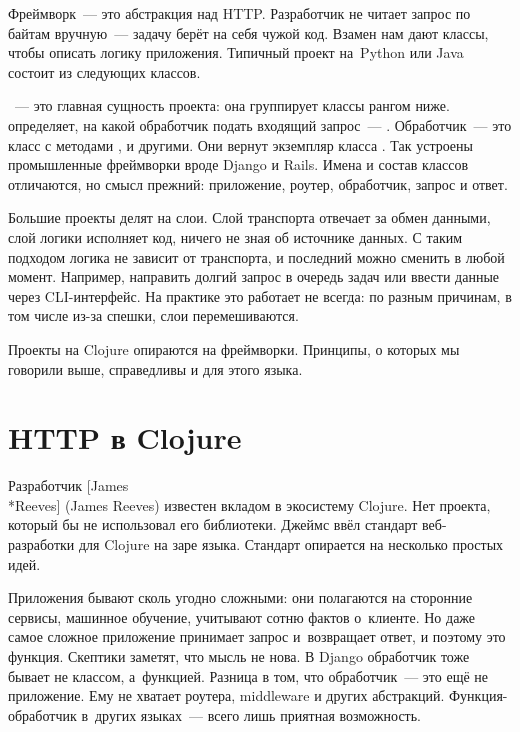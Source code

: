 Фреймворк~--- это абстракция над HTTP. Разработчик не читает запрос по байтам
вручную~--- задачу берёт на себя чужой код. Взамен нам дают классы, чтобы
описать логику приложения. Типичный проект на~Python или Java состоит из
следующих классов.

~--- это главная сущность проекта: она группирует классы рангом
ниже.  определяет, на какой обработчик подать входящий запрос~---
. Обработчик~--- это класс  с методами
,  и другими. Они вернут экземпляр класса
. Так устроены промышленные фреймворки вроде Django и
Rails. Имена и состав классов отличаются, но смысл прежний: приложение, роутер,
обработчик, запрос и ответ.


Большие проекты делят на слои. Слой транспорта отвечает за обмен данными, слой
логики исполняет код, ничего не зная об источнике данных. С таким подходом
логика не зависит от транспорта, и последний можно сменить в любой
момент. Например, направить долгий запрос в очередь задач или ввести данные
через CLI-интерфейс. На практике это работает не всегда: по разным причинам, в
том числе из-за спешки, слои перемешиваются.

Проекты на Clojure опираются на фреймворки. Принципы, о которых мы говорили
выше, справедливы и для этого языка.

\section{HTTP в Clojure}


Разработчик [James\\*Reeves] (James Reeves)
известен вкладом в экосистему Clojure. Нет проекта, который бы не использовал
его библиотеки. Джеймс ввёл стандарт веб-разработки для Clojure на заре
языка. Стандарт опирается на несколько простых идей.

Приложения бывают сколь угодно сложными: они полагаются на сторонние сервисы,
машинное обучение, учитывают сотню фактов о~клиенте. Но даже самое сложное
приложение принимает запрос и~возвращает ответ, и поэтому это функция. Скептики
заметят, что мысль не нова. В Django обработчик тоже бывает не классом,
а~функцией. Разница в том, что обработчик~--- это ещё не приложение. Ему не
хватает роутера, middleware и других абстракций. Функция-обработчик в~других
языках~--- всего лишь приятная возможность.

